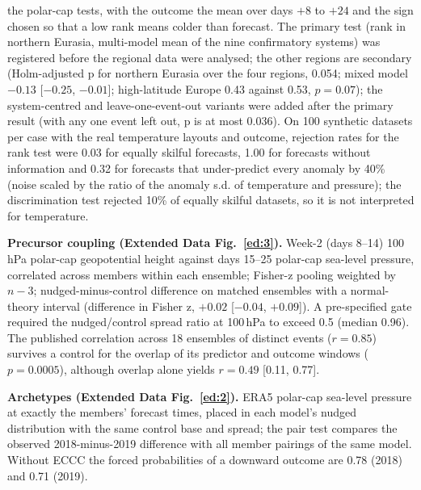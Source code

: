 \documentclass[11pt]{article}
\begin{document}
the polar-cap tests, with the outcome the mean over days $+8$ to $+24$ and the sign chosen so that a low rank means colder than forecast. The primary test (rank in northern Eurasia, multi-model mean of the nine confirmatory systems) was registered before the regional data were analysed; the other regions are secondary (Holm-adjusted p for northern Eurasia over the four regions, 0.054; mixed model $-0.13$ [$-0.25$, $-0.01$]; high-latitude Europe 0.43 against 0.53, $p = 0.07$); the system-centred and leave-one-event-out variants were added after the primary result (with any one event left out, p is at most 0.036). On 100 synthetic datasets per case with the real temperature layouts and outcome, rejection rates for the rank test were 0.03 for equally skilful forecasts, 1.00 for forecasts without information and 0.32 for forecasts that under-predict every anomaly by 40\% (noise scaled by the ratio of the anomaly s.d. of temperature and pressure); the discrimination test rejected 10\% of equally skilful datasets, so it is not interpreted for temperature.

\textbf{Precursor coupling (Extended Data Fig.~\ref{ed:3}).} Week-2 (days 8–14) 100\,hPa polar-cap geopotential height against days 15–25 polar-cap sea-level pressure, correlated across members within each ensemble; Fisher-z pooling weighted by $n-3$; nudged-minus-control difference on matched ensembles with a normal-theory interval (difference in Fisher z, $+0.02$ [$-0.04$, $+0.09$]). A pre-specified gate required the nudged/control spread ratio at 100\,hPa to exceed 0.5 (median 0.96). The published correlation across 18 ensembles of distinct events\cite{loeffel26} ($r = 0.85$) survives a control for the overlap of its predictor and outcome windows ($p = 0.0005$), although overlap alone yields $r = 0.49$ [0.11, 0.77].

\textbf{Archetypes (Extended Data Fig.~\ref{ed:2}).} ERA5 polar-cap sea-level pressure at exactly the members' forecast times, placed in each model's nudged distribution with the same control base and spread; the pair test compares the observed 2018-minus-2019 difference with all member pairings of the same model. Without ECCC the forced probabilities of a downward outcome are 0.78 (2018) and 0.71 (2019).
\end{document}
